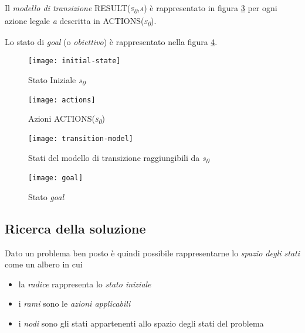 Il \emph{modello di transizione} \textsc{RESULT(\emph{s\textsubscript{0}},\emph{a})} è rappresentato in figura \ref{tmodel} per ogni azione legale \emph{a} descritta in \textsc{ACTIONS(\emph{s\textsubscript{0}})}.

Lo stato di \emph{goal} (o \emph{obiettivo}) è rappresentato nella figura \ref{goal}.

\begin{figure}[!htbp]
  \begin{center}
    \leavevmode
      \texttt{[image: initial-state]}
    \caption{Stato Iniziale \emph{s\textsubscript{0}}}
    \label{stato-iniziale}
  \end{center}
\end{figure}


\begin{figure}[!htbp]
  \begin{center}
    \leavevmode
      \texttt{[image: actions]}
    \caption{Azioni \textsc{ACTIONS(\emph{s\textsubscript{0}})}}
    \label{azioni}
  \end{center}
\end{figure}



\begin{figure}[!htbp]
  \begin{center}
    \leavevmode
      \texttt{[image: transition-model]}
    \caption{Stati del modello di transizione raggiungibili da \emph{s\textsubscript{0}}}
    \label{tmodel}
  \end{center}
\end{figure}


\begin{figure}[!htbp]
  \begin{center}
    \leavevmode
      \texttt{[image: goal]}
    \caption{Stato \emph{goal}}
    \label{goal}
  \end{center}
\end{figure}



\subsection{Ricerca della soluzione}

Dato un problema ben posto è quindi possibile rappresentarne lo \emph{spazio degli stati} come un albero in cui
\begin{itemize}
   \item la \emph{radice} rappresenta lo \emph{stato iniziale}
   \item i \emph{rami} sono le \emph{azioni applicabili}
   \item i \emph{nodi} sono gli stati appartenenti allo spazio degli stati del problema
\end{itemize} 


